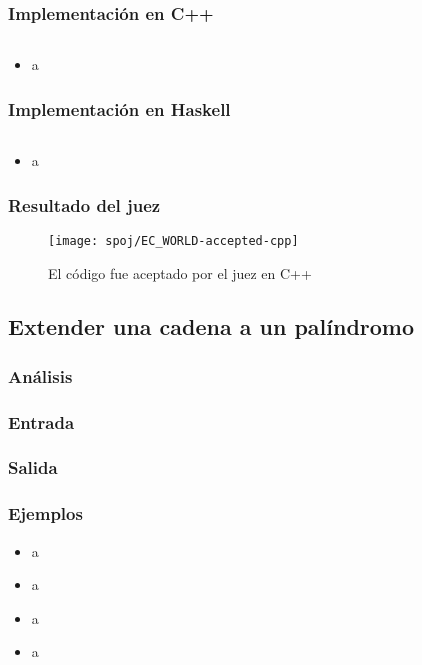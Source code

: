 

\subsubsection{Implementación en C++}
\inputminted[linenos, frame=lines, fontsize=\footnotesize]{cpp}{problemas/cpp/EC_WORLD.cpp}
\begin{itemize}
\item a
\end{itemize}

\subsubsection{Implementación en Haskell}
\inputminted[linenos, frame=lines, fontsize=\small]{haskell}{problemas/haskell/EC_WORLD.hs}
\begin{itemize}
\item a
\end{itemize}

\subsubsection{Resultado del juez}
\begin{figure}[h]
\centering
\texttt{[image: spoj/EC\_WORLD-accepted-cpp]}
\caption{El código fue aceptado por el juez en C++}
\end{figure}

\newpage


\subsection{Extender una cadena a un palíndromo}

\subsubsection{Análisis}

\subsubsection{Entrada}

\subsubsection{Salida}

\subsubsection{Ejemplos}
\begin{itemize}
\item a
\item a
\item a
\item a
\end{itemize}

